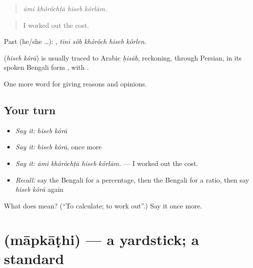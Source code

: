 \begin{quote}
   
\end{quote}

\begin{quote}
\emph{āmi khôrôchṭā hiseb kôrlām.}
\end{quote}

\begin{quote}
I worked out the cost.
\end{quote}

Past (he/she …):     , \emph{tini sôb khôrôch hiseb kôrlen}.

\begin{cousinweb}
\textbf{ } (\emph{hiseb kôrā}) is usually traced to Arabic \emph{ḥisāb}, reckoning, through Persian, in its spoken Bengali form , with .
\end{cousinweb}

\begin{grammarlens}[title={What you've built}]
One more word for giving reasons and opinions.
\end{grammarlens}

\subsection*{Your turn}
\begin{itemize}
\raggedright
  \item \emph{Say it:} \emph{hiseb kôrā}
  \item \emph{Say it:} \emph{hiseb kôrā}, once more
  \item \emph{Say it:} \emph{āmi khôrôchṭā hiseb kôrlām.} — I worked out the cost.
  \item \emph{Recall:} say the Bengali for a percentage, then the Bengali for a ratio, then say \emph{hiseb kôrā} again
\end{itemize}

\begin{tcolorbox}[breakable,colback=teal!4,colframe=teal!35!black,title={Before you move on}]
What does   mean? (\textquotedblleft{}To calculate; to work out\textquotedblright{}.) Say it once more.
\end{tcolorbox}
\section[\texorpdfstring{\bn{মাপকাঠি} (māpkāṭhi)}{মাপকাঠি (māpkāṭhi)}]{ (māpkāṭhi) — a yardstick; a standard}

